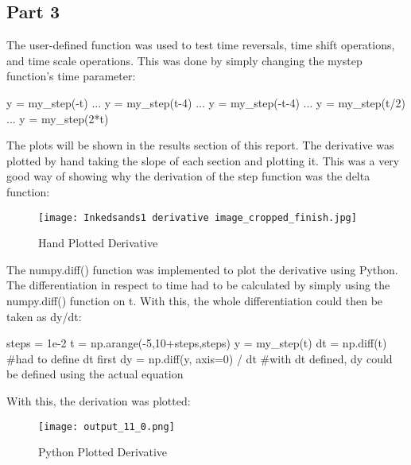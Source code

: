 \documentclass[12pt]{article}
\begin{document}
\subsection{Part 3}
The user-defined function was used to test time reversals, time shift operations, and time scale operations. This was done by simply changing the mystep function's time parameter:
\begin{python}
y = my_step(-t)
...
y = my_step(t-4)
...
y = my_step(-t-4)
...
y = my_step(t/2)
...
y = my_step(2*t)

\end{python}
The plots will be shown in the results section of this report.
\newline
The derivative was plotted by hand taking the slope of each section and plotting it. This was a very good way of showing why the derivation of the step function was the delta function:
\begin{figure}[H]
\centering
\texttt{[image: Inkedsands1 derivative image\_cropped\_finish.jpg]}
\caption{Hand Plotted Derivative \label{overflow}}
\end{figure}
The numpy.diff() function was implemented to plot the derivative using Python. 
The differentiation in respect to time had to be calculated by simply using the numpy.diff() function on t.
With this, the whole differentiation could then be taken as dy/dt:
\begin{python}
steps = 1e-2
t = np.arange(-5,10+steps,steps) 
y = my_step(t)
dt = np.diff(t) #had to define dt first
dy = np.diff(y, axis=0) / dt #with dt defined, dy could be defined using the actual equation
\end{python}
With this, the derivation was plotted:
\begin{figure}[H]
\centering
\texttt{[image: output\_11\_0.png]}
\caption{Python Plotted Derivative \label{overflow}}
\end{figure}
\end{document}
